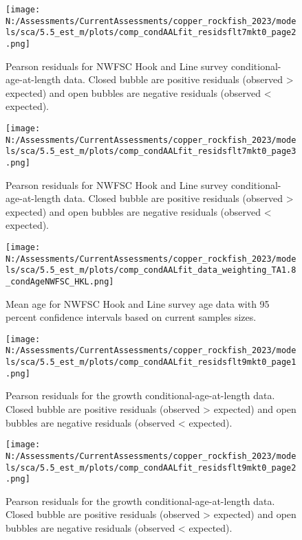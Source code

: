 \documentclass[11pt,
  english,
  letterpaper,
]{article}
\begin{document}
\begin{figure}
\centering
\texttt{[image: N:/Assessments/CurrentAssessments/copper\_rockfish\_2023/models/sca/5.5\_est\_m/plots/comp\_condAALfit\_residsflt7mkt0\_page2.png]}
\caption{Pearson residuals for NWFSC Hook and Line survey conditional-age-at-length data. Closed bubble are positive residuals (observed \textgreater{} expected) and open bubbles are negative residuals (observed \textless{} expected).\label{fig:nwfsc-hkl-age-pearson-2}}
\end{figure}

\begin{figure}
\centering
\texttt{[image: N:/Assessments/CurrentAssessments/copper\_rockfish\_2023/models/sca/5.5\_est\_m/plots/comp\_condAALfit\_residsflt7mkt0\_page3.png]}
\caption{Pearson residuals for NWFSC Hook and Line survey conditional-age-at-length data. Closed bubble are positive residuals (observed \textgreater{} expected) and open bubbles are negative residuals (observed \textless{} expected).\label{fig:nwfsc-hkl-age-pearson-3}}
\end{figure}

\begin{figure}
\centering
\texttt{[image: N:/Assessments/CurrentAssessments/copper\_rockfish\_2023/models/sca/5.5\_est\_m/plots/comp\_condAALfit\_data\_weighting\_TA1.8\_condAgeNWFSC\_HKL.png]}
\caption{Mean age for NWFSC Hook and Line survey age data with 95 percent confidence intervals based on current samples sizes.\label{fig:nwfsc-hkl-mean-age-fit}}
\end{figure}

\begin{figure}
\centering
\texttt{[image: N:/Assessments/CurrentAssessments/copper\_rockfish\_2023/models/sca/5.5\_est\_m/plots/comp\_condAALfit\_residsflt9mkt0\_page1.png]}
\caption{Pearson residuals for the growth conditional-age-at-length data. Closed bubble are positive residuals (observed \textgreater{} expected) and open bubbles are negative residuals (observed \textless{} expected).\label{fig:growth-age-pearson-1}}
\end{figure}

\begin{figure}
\centering
\texttt{[image: N:/Assessments/CurrentAssessments/copper\_rockfish\_2023/models/sca/5.5\_est\_m/plots/comp\_condAALfit\_residsflt9mkt0\_page2.png]}
\caption{Pearson residuals for the growth conditional-age-at-length data. Closed bubble are positive residuals (observed \textgreater{} expected) and open bubbles are negative residuals (observed \textless{} expected).\label{fig:growth-age-pearson-2}}
\end{figure}
\end{document}
